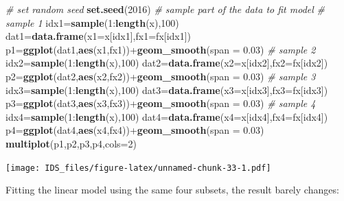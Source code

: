 \documentclass[12pt,]{krantz}
\newenvironment{Shaded}{\begin{snugshade}}{\end{snugshade}}
\newcommand{\KeywordTok}[1]{\textcolor[rgb]{0.13,0.29,0.53}{\textbf{{#1}}}}
\newcommand{\DataTypeTok}[1]{\textcolor[rgb]{0.13,0.29,0.53}{{#1}}}
\newcommand{\DecValTok}[1]{\textcolor[rgb]{0.00,0.00,0.81}{{#1}}}
\newcommand{\FloatTok}[1]{\textcolor[rgb]{0.00,0.00,0.81}{{#1}}}
\newcommand{\CommentTok}[1]{\textcolor[rgb]{0.56,0.35,0.01}{\textit{{#1}}}}
\newcommand{\NormalTok}[1]{{#1}}
\theoremstyle{definition}
\theoremstyle{definition}
\theoremstyle{remark}
\begin{document}
\begin{Shaded}
\begin{Highlighting}[]
\CommentTok{# set random seed}
\KeywordTok{set.seed}\NormalTok{(}\DecValTok{2016}\NormalTok{)}
\CommentTok{# sample part of the data to fit model}
\CommentTok{# sample 1}
\NormalTok{idx1=}\KeywordTok{sample}\NormalTok{(}\DecValTok{1}\NormalTok{:}\KeywordTok{length}\NormalTok{(x),}\DecValTok{100}\NormalTok{)}
\NormalTok{dat1=}\KeywordTok{data.frame}\NormalTok{(}\DataTypeTok{x1=}\NormalTok{x[idx1],}\DataTypeTok{fx1=}\NormalTok{fx[idx1])}
\NormalTok{p1=}\KeywordTok{ggplot}\NormalTok{(dat1,}\KeywordTok{aes}\NormalTok{(x1,fx1))+}\KeywordTok{geom_smooth}\NormalTok{(}\DataTypeTok{span =} \FloatTok{0.03}\NormalTok{)}
\CommentTok{# sample 2}
\NormalTok{idx2=}\KeywordTok{sample}\NormalTok{(}\DecValTok{1}\NormalTok{:}\KeywordTok{length}\NormalTok{(x),}\DecValTok{100}\NormalTok{)}
\NormalTok{dat2=}\KeywordTok{data.frame}\NormalTok{(}\DataTypeTok{x2=}\NormalTok{x[idx2],}\DataTypeTok{fx2=}\NormalTok{fx[idx2])}
\NormalTok{p2=}\KeywordTok{ggplot}\NormalTok{(dat2,}\KeywordTok{aes}\NormalTok{(x2,fx2))+}\KeywordTok{geom_smooth}\NormalTok{(}\DataTypeTok{span =} \FloatTok{0.03}\NormalTok{)}
\CommentTok{# sample 3}
\NormalTok{idx3=}\KeywordTok{sample}\NormalTok{(}\DecValTok{1}\NormalTok{:}\KeywordTok{length}\NormalTok{(x),}\DecValTok{100}\NormalTok{)}
\NormalTok{dat3=}\KeywordTok{data.frame}\NormalTok{(}\DataTypeTok{x3=}\NormalTok{x[idx3],}\DataTypeTok{fx3=}\NormalTok{fx[idx3])}
\NormalTok{p3=}\KeywordTok{ggplot}\NormalTok{(dat3,}\KeywordTok{aes}\NormalTok{(x3,fx3))+}\KeywordTok{geom_smooth}\NormalTok{(}\DataTypeTok{span =} \FloatTok{0.03}\NormalTok{)}
\CommentTok{# sample 4}
\NormalTok{idx4=}\KeywordTok{sample}\NormalTok{(}\DecValTok{1}\NormalTok{:}\KeywordTok{length}\NormalTok{(x),}\DecValTok{100}\NormalTok{)}
\NormalTok{dat4=}\KeywordTok{data.frame}\NormalTok{(}\DataTypeTok{x4=}\NormalTok{x[idx4],}\DataTypeTok{fx4=}\NormalTok{fx[idx4])}
\NormalTok{p4=}\KeywordTok{ggplot}\NormalTok{(dat4,}\KeywordTok{aes}\NormalTok{(x4,fx4))+}\KeywordTok{geom_smooth}\NormalTok{(}\DataTypeTok{span =} \FloatTok{0.03}\NormalTok{)}
\KeywordTok{multiplot}\NormalTok{(p1,p2,p3,p4,}\DataTypeTok{cols=}\DecValTok{2}\NormalTok{)}
\end{Highlighting}
\end{Shaded}

\texttt{[image: IDS\_files/figure-latex/unnamed-chunk-33-1.pdf]}

Fitting the linear model using the same four subsets, the result barely
changes:
\end{document}
